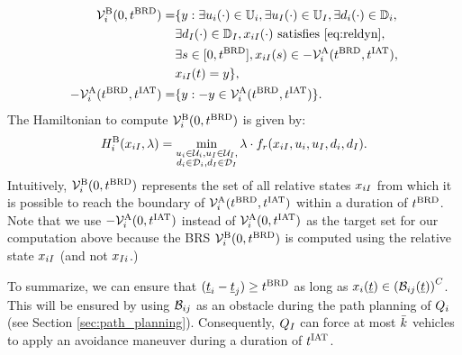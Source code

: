 %
\begin{equation} \label{eqn:buffBRS_case1}
\begin{aligned}
\brs^{\text{B}}_{i}(0, \brd) = & \{y: \exists \ctrl_i(\cdot) \in \cfset_i, \exists \ctrl_\intr(\cdot) \in \cfset_\intr, \exists \dstb_i(\cdot) \in \dfset_i, \\
& \exists \dstb_\intr(\cdot) \in \dfset_\intr, \state_{i \intr}(\cdot) \text{ satisfies \eqref{eq:reldyn}},\\
& \exists s \in [0, \brd], \state_{i \intr}(s) \in -\brs^{\text{A}}_{i}(\brd, \iat),\\
& \state_{i \intr}(t) = y\},\\
-\brs^{\text{A}}_{i}(\brd, \iat) = & \{y: -y \in \brs^{\text{A}}_{i}(\brd, \iat) \}.
\end{aligned}
\end{equation}
The Hamiltonian to compute $\mathcal{V}^{\text{B}}_{i}(0, t^\text{BRD})$ is given by:
\begin{equation} 
H^{\text{B}}_{i}(x_{i I}, \lambda) = \min_{\substack{u_i \in \mathcal{U}_i, u_I \in \mathcal{U}_I, \\ d_i \in \mathcal{D}_i, d_I \in \mathcal{D}_I}} \lambda \cdot f_r(x_{i I}, u_i, u_I, d_i, d_I).
\end{equation}
Intuitively, $\mathcal{V}^{\text{B}}_{i}(0, t^\text{BRD})$ represents the set of all relative states $x_{i I}$ from which it is possible to reach the boundary of $\mathcal{V}^{\text{A}}_{i}(t^\text{BRD}, t^\text{IAT})$ within a duration of $t^\text{BRD}$. Note that we use $-\mathcal{V}^{\text{A}}_{i}(0, t^\text{IAT})$ instead of $\mathcal{V}^{\text{A}}_{i}(0, t^\text{IAT})$ as the target set for our computation above because the BRS $\mathcal{V}^{\text{B}}_{i}(0, t^\text{BRD})$ is computed using the relative state $x_{i I}$ (and not $x_{I i}$.)  %
%

To summarize, we can ensure that $(\underline{t}_i - \underline{t}_j) \geq t^\text{BRD}$ as long as $x_i(\underline{t}) \in \left(\mathcal{B}_{ij}(\underline{t})\right)^C$. This will be ensured by using $\mathcal{B}_{ij}$ as an obstacle during the path planning of $Q_i$ (see Section \ref{sec:path_planning}). Consequently, $Q_{I}$ can force at most $\bar{k}$ vehicles to apply an avoidance maneuver during a duration of $t^\text{IAT}$.